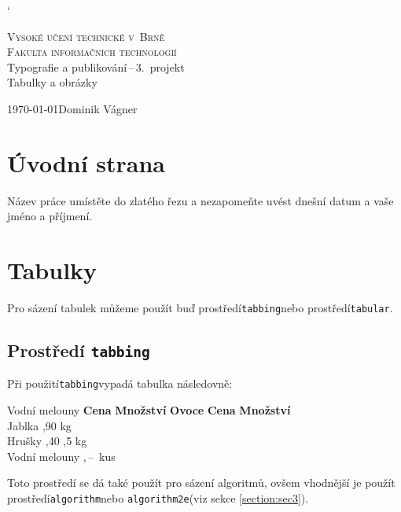 \documentclass[a4paper, 11pt]{article}
\begin{document}
\catcode`

\begin{titlepage}
\begin{center}
\Huge
\textsc{Vysoké učení technické v~Brně} \\
\huge
\textsc{Fakulta informačních technologií} \\
\LARGE
Typografie a publikování\,--\,3.~projekt \\ [-0.75mm]
\Huge
Tabulky a obrázky \\
\end{center}
{\Large{\raggedleft\today}\hfill Dominik Vágner}
\vspace{1em}
\end{titlepage}

\newpage{}

\section{Úvodní strana} \label{section:sec1}
Název práce umístěte do zlatého řezu a nezapomeňte uvést dnešní datum a vaše jméno a příjmení.

\section{Tabulky} \label{section:sec2}
Pro sázení tabulek můžeme použít buď prostředí\enspace\texttt{tabbing}\enspace nebo prostředí\enspace \texttt{tabular}.

\subsection{Prostředí \enspace\texttt{tabbing}}
Při použití\enspace\texttt{tabbing}\enspace vypadá tabulka následovně:
\begin{tabbing}
Vodní melouny \quad \= \textbf{Cena} \quad \= \textbf{Množství} \quad \kill
\textbf{Ovoce} \> \textbf{Cena} \> \textbf{Množství} \\
Jablka ,90  kg \\
Hrušky ,40 ,5 kg \\
Vodní melouny ,\,--\,  kus \\
\end{tabbing}
Toto prostředí se dá také použít pro sázení algoritmů, ovšem vhodnější je použít prostředí\enspace\texttt{algorithm}\enspace nebo \texttt{algorithm2e}\enspace (viz sekce \ref{section:sec3}).
\end{document}
